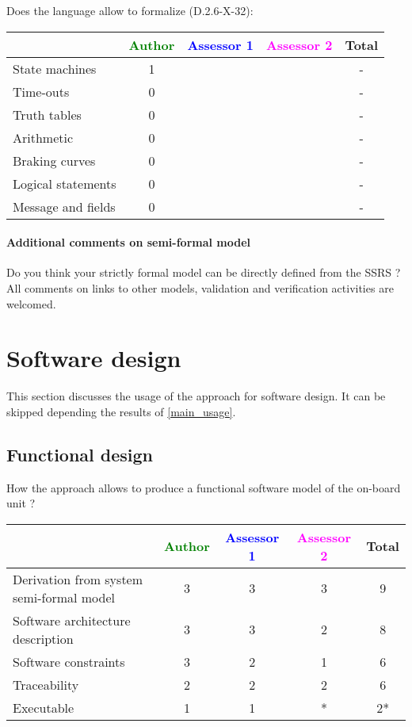Does the language allow to formalize (D.2.6-X-32):

\begin{tabular}{|l | c | c | c | c|}
\hline
& \textcolor{green}{Author} & \textcolor{blue}{Assessor 1} & \textcolor{magenta}{Assessor 2} & Total \\
\hline
State machines & 1 & & & - \\
\hline
Time-outs & 0 &  & & - \\
\hline
Truth tables & 0 & & & - \\
\hline
Arithmetic & 0 & & & - \\
\hline
Braking curves & 0 & & & - \\
\hline
Logical statements & 0 & & & - \\
\hline
Message and fields & 0 & & & - \\
\hline
\end{tabular}

\paragraph{Additional comments on semi-formal model} Do you think your strictly formal model can be directly defined from the SSRS ?
All comments on links to other models, validation and verification activities are welcomed.

\section{Software design}
This section discusses the usage of the approach for software design.
It can be skipped depending the results of \ref{main_usage}.

\subsection{Functional design}

How the approach allows to produce a functional software model of the on-board unit ?

\begin{tabular}{|l | c | c | c | c|}
\hline
& \textcolor{green}{Author} & \textcolor{blue}{Assessor 1} & \textcolor{magenta}{Assessor 2} & Total \\
\hline
Derivation from system semi-formal model & 3 & 3 & 3 & 9 \\
\hline
Software architecture description & 3 & 3 & 2 & 8 \\
\hline
Software constraints & 3 & 2 & 1 & 6 \\
\hline
Traceability & 2 & 2 & 2 & 6 \\
\hline
Executable & 1 & 1 & * & 2* \\
\hline
\end{tabular}



